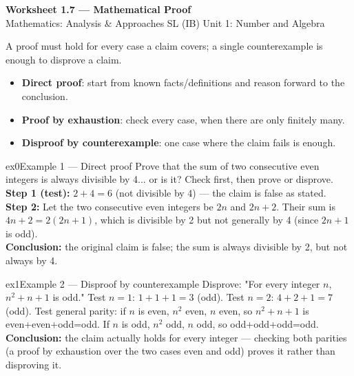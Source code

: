 \documentclass[11pt]{article}
\begin{document}
\begin{center}
{\LARGE\bfseries\color{titleblue}Worksheet 1.7 --- Mathematical Proof}\\[2pt]
{\small Mathematics: Analysis \& Approaches SL (IB) \textperiodcentered{} Unit 1: Number and Algebra}
\end{center}

\begin{ideabox}
A proof must hold for every case a claim covers; a single counterexample is enough to disprove a claim.
\begin{itemize}[leftmargin=*,itemsep=2pt]
  \item \textbf{Direct proof}: start from known facts/definitions and reason forward to the conclusion.
  \item \textbf{Proof by exhaustion}: check every case, when there are only finitely many.
  \item \textbf{Disproof by counterexample}: one case where the claim fails is enough.
\end{itemize}
\end{ideabox}


\begin{example}{ex0}{Example 1 --- Direct proof}
Prove that the sum of two consecutive even integers is always divisible by 4... or is it? Check first, then prove or disprove.\soln
\textbf{Step 1 (test):} $2+4=6$ (not divisible by 4) --- the claim is false as stated.\\[3pt]
\textbf{Step 2:} Let the two consecutive even integers be $2n$ and $2n+2$. Their sum is $4n+2=2(2n+1)$, which is divisible by 2 but not generally by 4 (since $2n+1$ is odd).\\[3pt]\textbf{Conclusion:} the original claim is false; the sum is always divisible by 2, but not always by 4.
\end{example}

\begin{example}{ex1}{Example 2 --- Disproof by counterexample}
Disprove: "For every integer $n$, $n^2+n+1$ is odd."\soln
Test $n=1$: $1+1+1=3$ (odd). Test $n=2$: $4+2+1=7$ (odd). Test general parity: if $n$ is even, $n^2$ even, $n$ even, so $n^2+n+1$ is even+even+odd=odd. If $n$ is odd, $n^2$ odd, $n$ odd, so odd+odd+odd=odd.\\[3pt]\textbf{Conclusion:} the claim actually holds for every integer --- checking both parities (a proof by exhaustion over the two cases even and odd) proves it rather than disproving it.
\end{example}
\end{document}
